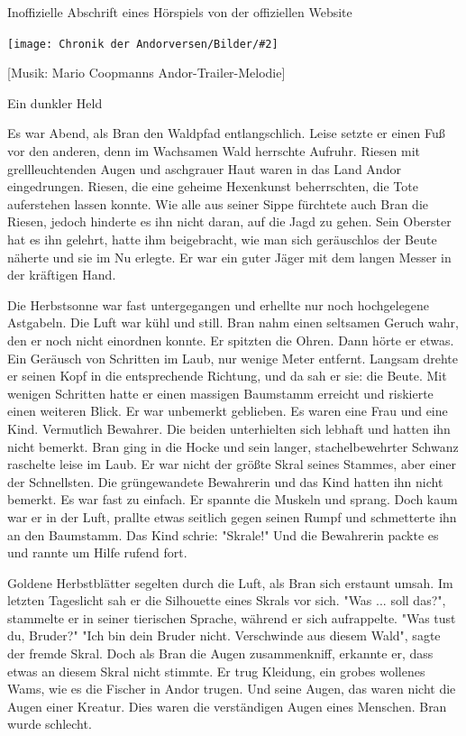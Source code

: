 \documentclass[10pt, a4paper, oneside]{book}
\newcommand{\bildmitts}[2][height=0.32\textwidth,width=0.48\textwidth,keepaspectratio]{%
    \begin{center}
        \texttt{[image: Chronik der Andorversen/Bilder/\#2]}
    \end{center}
}
\begin{document}
\begin{multicols}{2}
\begin{center}
    Inoffizielle Abschrift eines Hörspiels von der offiziellen Website
\end{center}

\bildmitts{Ein dunkler Held (2016).jpeg}



[Musik: Mario Coopmanns Andor-Trailer-Melodie]

Ein dunkler Held

Es war Abend, als Bran den Waldpfad entlangschlich. Leise setzte er einen Fuß vor den anderen, denn im Wachsamen Wald herrschte Aufruhr. Riesen mit grellleuchtenden Augen und aschgrauer Haut waren in das Land Andor eingedrungen. Riesen, die eine geheime Hexenkunst beherrschten, die Tote auferstehen lassen konnte. Wie alle aus seiner Sippe fürchtete auch Bran die Riesen, jedoch hinderte es ihn nicht daran, auf die Jagd zu gehen. Sein Oberster hat es ihn gelehrt, hatte ihm beigebracht, wie man sich geräuschlos der Beute näherte und sie im Nu erlegte. Er war ein guter Jäger mit dem langen Messer in der kräftigen Hand. 

Die Herbstsonne war fast untergegangen und erhellte nur noch hochgelegene Astgabeln. Die Luft war kühl und still. Bran nahm einen seltsamen Geruch wahr, den er noch nicht einordnen konnte. Er spitzten die Ohren. Dann hörte er etwas. Ein Geräusch von Schritten im Laub, nur wenige Meter entfernt. Langsam drehte er seinen Kopf in die entsprechende Richtung, und da sah er sie: die Beute. Mit wenigen Schritten hatte er einen massigen Baumstamm erreicht und riskierte einen weiteren Blick. Er war unbemerkt geblieben. Es waren eine Frau und eine Kind. Vermutlich Bewahrer. Die beiden unterhielten sich lebhaft und hatten ihn nicht bemerkt. Bran ging in die Hocke und sein langer, stachelbewehrter Schwanz raschelte leise im Laub. Er war nicht der größte Skral seines Stammes, aber einer der Schnellsten. Die grüngewandete Bewahrerin und das Kind hatten ihn nicht bemerkt. Es war fast zu einfach. Er spannte die Muskeln und sprang. Doch kaum war er in der Luft, prallte etwas seitlich gegen seinen Rumpf und schmetterte ihn an den Baumstamm. Das Kind schrie: "Skrale!" Und die Bewahrerin packte es und rannte um Hilfe rufend fort. 

Goldene Herbstblätter segelten durch die Luft, als Bran sich erstaunt umsah. Im letzten Tageslicht sah er die Silhouette eines Skrals vor sich. "Was ... soll das?", stammelte er in seiner tierischen Sprache, während er sich aufrappelte. "Was tust du, Bruder?" "Ich bin dein Bruder nicht. Verschwinde aus diesem Wald", sagte der fremde Skral. Doch als Bran die Augen zusammenkniff, erkannte er, dass etwas an diesem Skral nicht stimmte. Er trug Kleidung, ein grobes wollenes Wams, wie es die Fischer in Andor trugen. Und seine Augen, das waren nicht die Augen einer Kreatur. Dies waren die verständigen Augen eines Menschen. Bran wurde schlecht.


\end{multicols}
\end{document}
